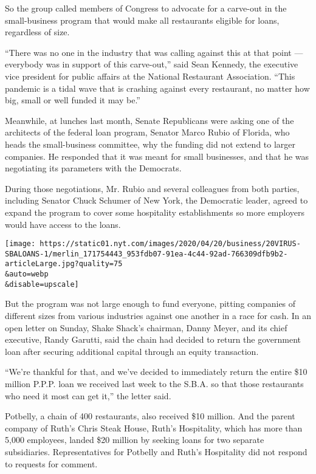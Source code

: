 So the group called members of Congress to advocate for a carve-out in
the small-business program that would make all restaurants eligible for
loans, regardless of size.

``There was no one in the industry that was calling against this at that
point --- everybody was in support of this carve-out,'' said Sean
Kennedy, the executive vice president for public affairs at the National
Restaurant Association. ``This pandemic is a tidal wave that is crashing
against every restaurant, no matter how big, small or well funded it may
be.''

Meanwhile, at lunches last month, Senate Republicans were asking one of
the architects of the federal loan program, Senator Marco Rubio of
Florida, who heads the small-business committee, why the funding did not
extend to larger companies. He responded that it was meant for small
businesses, and that he was negotiating its parameters with the
Democrats.

During those negotiations, Mr. Rubio and several colleagues from both
parties, including Senator Chuck Schumer of New York, the Democratic
leader, agreed to expand the program to cover some hospitality
establishments so more employers would have access to the loans.

\texttt{[image: https://static01.nyt.com/images/2020/04/20/business/20VIRUS-SBALOANS-1/merlin\_171754443\_953fdb07-91ea-4c44-92ad-766309dfb9b2-articleLarge.jpg?quality=75\\\&auto=webp\\\&disable=upscale]}

But the program was not large enough to fund everyone, pitting companies
of different sizes from various industries against one another in a race
for cash. In an open letter on Sunday, Shake Shack's chairman, Danny
Meyer, and its chief executive, Randy Garutti, said the chain had
decided to return the government loan after securing additional capital
through an equity transaction.

``We're thankful for that, and we've decided to immediately return the
entire \$10 million P.P.P. loan we received last week to the S.B.A. so
that those restaurants who need it most can get it,'' the letter said.

Potbelly, a chain of 400 restaurants, also received \$10 million. And
the parent company of Ruth's Chris Steak House, Ruth's Hospitality,
which has more than 5,000 employees, landed \$20 million by seeking
loans for two separate subsidiaries. Representatives for Potbelly and
Ruth's Hospitality did not respond to requests for comment.

